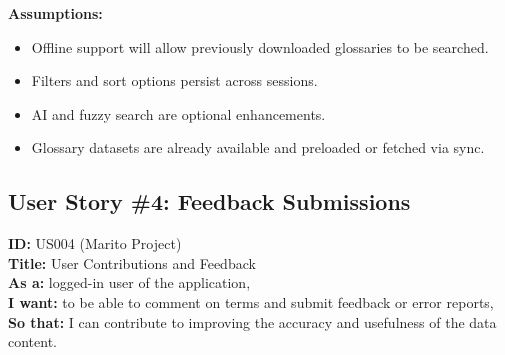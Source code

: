 \documentclass[12pt]{article}
\begin{document}
\vspace{1em}
\textbf{Assumptions:}
\begin{itemize}
    \item Offline support will allow previously downloaded glossaries to be searched.
    \item Filters and sort options persist across sessions.
    \item AI and fuzzy search are optional enhancements.
    \item Glossary datasets are already available and preloaded or fetched via sync.
\end{itemize}

\subsection{User Story \#4: Feedback Submissions}
\textbf{ID:} US004 (Marito Project) \\
\textbf{Title:} User Contributions and Feedback \\
\textbf{As a:} logged-in user of the application, \\
\textbf{I want:} to be able to comment on terms and submit feedback or error reports, \\
\textbf{So that:} I can contribute to improving the accuracy and usefulness of the data content.
\end{document}

